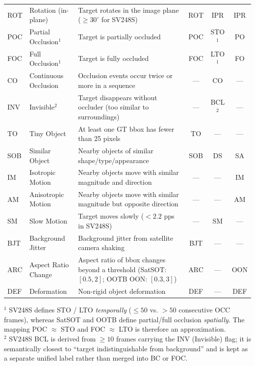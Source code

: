\begin{table}[t]
\begin{tabular}{llp{7.4cm}ccc}
ROT  & Rotation (in-plane)        & Target rotates in the image plane ($\geq 30^{\circ}$ for SV248S) & ROT & IPR & IPR \\
POC  & Partial Occlusion$^{1}$    & Target is partially occluded & POC & STO$^{1}$ & PO  \\
FOC  & Full Occlusion$^{1}$       & Target is fully occluded    & FOC & LTO$^{1}$ & FO  \\
CO   & Continuous Occlusion       & Occlusion events occur twice or more in a sequence & --- & CO  & --- \\
INV  & Invisible$^{2}$            & Target disappears without occluder (too similar to surroundings) & --- & BCL$^{2}$ & --- \\
TO   & Tiny Object                & At least one GT bbox has fewer than 25 pixels & TO  & --- & --- \\
SOB  & Similar Object             & Nearby objects of similar shape/type/appearance & SOB & DS  & SA  \\
IM   & Isotropic Motion           & Nearby objects move with similar magnitude and direction & --- & --- & IM  \\
AM   & Anisotropic Motion         & Nearby objects move with similar magnitude but opposite direction & --- & --- & AM  \\
SM   & Slow Motion                & Target moves slowly ($<2.2$ pps in SV248S) & --- & SM  & --- \\
BJT  & Background Jitter          & Background jitter from satellite camera shaking & BJT & --- & --- \\
ARC  & Aspect Ratio Change        & Aspect ratio of bbox changes beyond a threshold (SatSOT: $[0.5, 2]$; OOTB OON: $[0.3, 3]$) & ARC & --- & OON \\
DEF  & Deformation                & Non-rigid object deformation & DEF & --- & DEF \\
\bottomrule
\end{tabular}

\vspace{2pt}
\begin{flushleft}\footnotesize
$^{1}$ SV248S defines STO / LTO \emph{temporally} ($\leq 50$ vs. $>50$ consecutive OCC frames),
whereas SatSOT and OOTB define partial/full occlusion \emph{spatially}. The mapping
POC $\approx$ STO and FOC $\approx$ LTO is therefore an approximation.\\
$^{2}$ SV248S BCL is derived from $\geq 10$ frames carrying the INV (Invisible) flag;
it is semantically closest to ``target indistinguishable from background'' and is kept
as a separate unified label rather than merged into BC or FOC.
\end{flushleft}
\end{table}
